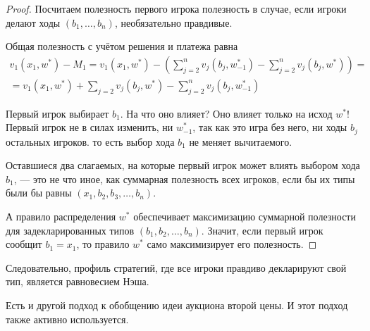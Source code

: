 \begin{proof}
Посчитаем полезность первого игрока полезность в случае, если игроки делают ходы $ (b_{1},\ldots,b_{n}) $, необязательно правдивые.

Общая полезность с учётом решения и платежа равна
\begin{multline}
v_{1}(x_{1},w^{*})-M_{1}=v_{1}(x_{1},w^{*})-\left(\sum_{j=2}^{n}v_{j}(b_{j},w_{-1}^{*})-\sum_{j=2}^{n}v_{j}(b_{j},w^{*})\right)=\\
=v_{1}(x_{1},w^{*})+\sum_{j=2}v_{j}(b_{j},w^{*})-\sum_{j=2}^{n}v_{j}(b_{j},w_{-1}^{*})
\end{multline}

Первый игрок выбирает $ b_{1} $. На что оно влияет? Оно влияет только на исход $ w^{*} $! Первый игрок не в силах изменить, ни  $ w_{-1}^{*} $, так как это игра без него, ни ходы $ b_{j} $ остальных игроков. то есть выбор хода $ b_{1} $ не меняет вычитаемого.

Оставшиеся два слагаемых, на которые первый игрок может влиять выбором хода $ b_{1} $, — это не что иное, как суммарная полезность всех игроков, если бы их типы были бы равны $ (x_{1},b_{2},b_{3},\ldots,b_{n}) $.

А правило распределения $ w^{*} $ обеспечивает максимизацию суммарной полезности для задекларированных типов $ (b_{1},b_{2},\ldots,b_{n}) $. Значит, если первый игрок сообщит $ b_{1}=x_{1} $, то правило $ w^{*} $ само максимизирует его полезность.

\end{proof}

Следовательно, профиль стратегий, где все игроки правдиво декларируют свой тип, является равновесием Нэша.







Есть и другой подход к обобщению идеи аукциона второй цены. И этот подход также активно используется.

